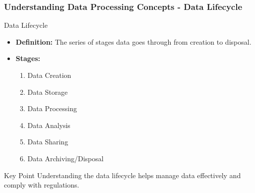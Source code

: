 \documentclass[aspectratio=169]{beamer}
\begin{document}
\begin{frame}[fragile]
    \frametitle{Understanding Data Processing Concepts - Data Lifecycle}
    \begin{block}{Data Lifecycle}
        \begin{itemize}
            \item \textbf{Definition:} The series of stages data goes through from creation to disposal.
            \item \textbf{Stages:}
            \begin{enumerate}
                \item Data Creation
                \item Data Storage
                \item Data Processing
                \item Data Analysis
                \item Data Sharing
                \item Data Archiving/Disposal
            \end{enumerate}
        \end{itemize}
    \end{block}
    \begin{block}{Key Point}
        Understanding the data lifecycle helps manage data effectively and comply with regulations.
    \end{block}
\end{frame}
\end{document}
